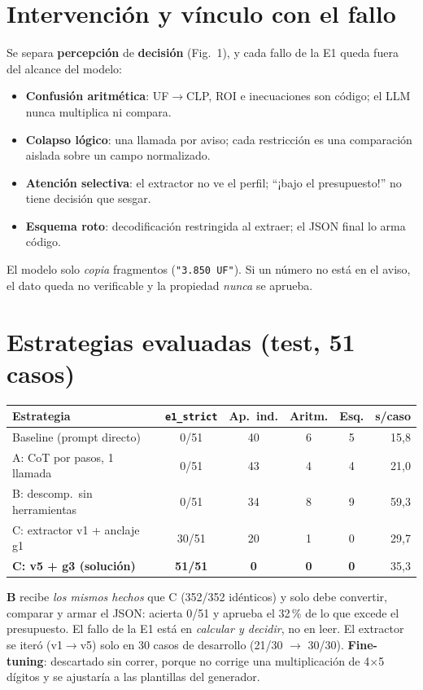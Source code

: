 \documentclass[9pt,a4paper,twocolumn]{extarticle}
\newcommand{\cod}[1]{\texttt{#1}}
\begin{document}
\section{Intervención y vínculo con el fallo}
Se separa \textbf{percepción} de \textbf{decisión} (Fig.~1), y cada fallo de la E1 queda fuera
del alcance del modelo:
\begin{itemize}
\item \textbf{Confusión aritmética}: UF$\to$CLP, ROI e inecuaciones son código; el LLM nunca
  multiplica ni compara.
\item \textbf{Colapso lógico}: una llamada por aviso; cada restricción es una comparación
  aislada sobre un campo normalizado.
\item \textbf{Atención selectiva}: el extractor no ve el perfil; ``¡bajo el presupuesto!'' no
  tiene decisión que sesgar.
\item \textbf{Esquema roto}: decodificación restringida al extraer; el JSON final lo arma código.
\end{itemize}
El modelo solo \emph{copia} fragmentos (\cod{"3.850 UF"}). Si un número no está en el aviso,
el dato queda no verificable y la propiedad \emph{nunca} se aprueba.

\section{Estrategias evaluadas (test, 51 casos)}
\begin{center}\footnotesize
\begin{tabular}{@{}lccccr@{}}
\toprule
Estrategia & \cod{e1\_strict} & Ap.\ ind. & Aritm. & Esq. & s/caso \\
\midrule
Baseline (prompt directo) & 0/51 & 40 & 6 & 5 & 15,8 \\
A: CoT por pasos, 1 llamada & 0/51 & 43 & 4 & 4 & 21,0 \\
B: descomp.\ sin herramientas & 0/51 & 34 & 8 & 9 & 59,3 \\
C: extractor v1 + anclaje g1 & 30/51 & 20 & 1 & 0 & 29,7 \\
\textbf{C: v5 + g3 (solución)} & \textbf{51/51} & \textbf{0} & \textbf{0} & \textbf{0} & 35,3 \\
\bottomrule
\end{tabular}
\end{center}
\textbf{B} recibe \emph{los mismos hechos} que C (352/352 idénticos) y solo debe convertir,
comparar y armar el JSON: acierta 0/51 y aprueba el 32\,\% de lo que excede el presupuesto.
El fallo de la E1 está en \emph{calcular y decidir}, no en leer. El extractor se iteró
(v1$\to$v5) solo en 30 casos de desarrollo (21/30 $\to$ 30/30). \textbf{Fine-tuning}:
descartado sin correr, porque no corrige una multiplicación de 4$\times$5 dígitos y se
ajustaría a las plantillas del generador.
\end{document}
